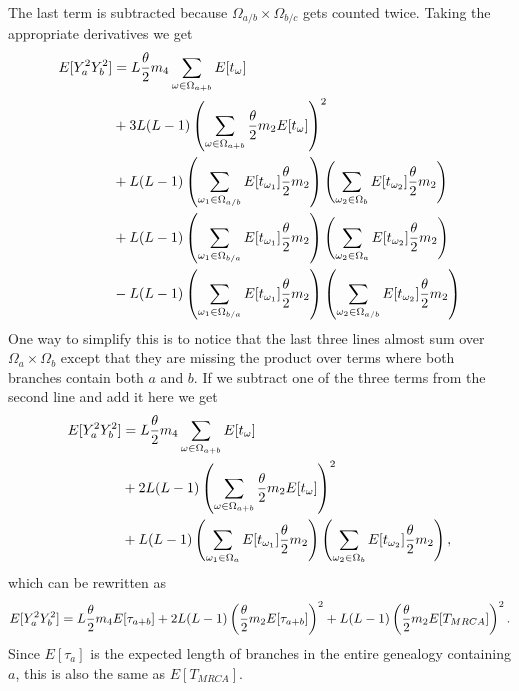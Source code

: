 The last term is subtracted because $\Omega_{a/b}\times\Omega_{b/c}$ gets
counted twice. Taking the appropriate derivatives we get
\begin{align*}
  E[Y_a^2Y_b^2] &= L \frac{\theta}{2} m_4 \sum_{\omega \in \Omega_{a+b}} E[t_\omega] \\
  &+ 3L(L-1) \left( \sum_{\omega \in \Omega_{a+b}} \frac{\theta}{2} m_2 E[t_\omega] \right)^2\\
  &+ L(L-1) \left( \sum_{\omega_1 \in \Omega_{a/b}} E[t_{\omega_1}] \frac{\theta}{2} m_2  \right)
  \left( \sum_{\omega_2 \in \Omega_{b}} E[t_{\omega_2}] \frac{\theta}{2} m_2 \right)\\
  &+ L(L-1) \left( \sum_{\omega_1 \in \Omega_{b/a}} E[t_{\omega_1}] \frac{\theta}{2} m_2  \right)
  \left( \sum_{\omega_2 \in \Omega_{a}} E[t_{\omega_2}] \frac{\theta}{2} m_2 \right)\\
  &- L(L-1) \left( \sum_{\omega_1 \in \Omega_{b/a}} E[t_{\omega_1}] \frac{\theta}{2} m_2 \right)
  \left( \sum_{\omega_2 \in \Omega_{a/b}} E[t_{\omega_2}] \frac{\theta}{2} m_2 \right)
\end{align*}
One way to simplify this is to notice that the last three lines almost sum over
$\Omega_a\times\Omega_b$ except that they are missing the product over terms
where both branches contain both $a$ and $b$. If we subtract one of the three
terms from the second line and add it here we get
\begin{align*}
  E[Y_a^2Y_b^2] &= L \frac{\theta}{2} m_4 \sum_{\omega \in \Omega_{a+b}} E[t_\omega] \\
  &+ 2L(L-1) \left( \sum_{\omega \in \Omega_{a+b}} \frac{\theta}{2} m_2 E[t_\omega] \right)^2\\
  &+ L(L-1) \left( \sum_{\omega_1 \in \Omega_{a}} E[t_{\omega_1}] \frac{\theta}{2} m_2  \right)
  \left( \sum_{\omega_2 \in \Omega_{b}} E[t_{\omega_2}] \frac{\theta}{2} m_2 \right),
\end{align*}
which can be rewritten as
\begin{equation}
  \label{eq:cross4}
  E[Y_a^2Y_b^2] = L \frac{\theta}{2} m_4 E[\tau_{a+b}]+2L(L-1) \left(\frac{\theta}{2} m_2 E[\tau_{a+b}]\right)^2
  + L(L-1) \left( \frac{\theta}{2} m_2 E[T_{MRCA}]\right)^2.
\end{equation}
Since $E[\tau_a]$ is the expected length of branches in the entire genealogy
containing $a$, this is also the same as $E[T_{MRCA}]$.
